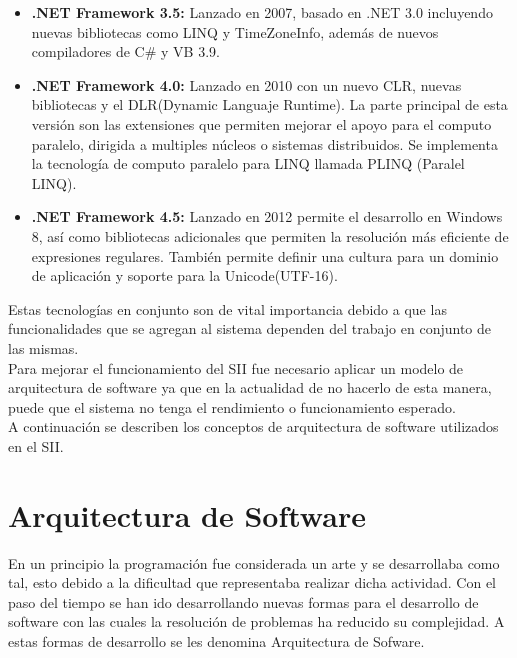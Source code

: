 \begin{itemize}
			\item \textbf{.NET Framework 3.5: } Lanzado en 2007, basado en .NET 3.0 incluyendo nuevas bibliotecas como LINQ y TimeZoneInfo, adem\'as de nuevos compiladores de C\# y VB 3.9.

			\item \textbf{.NET Framework 4.0: } Lanzado en 2010 con un nuevo CLR, nuevas bibliotecas y el DLR(Dynamic Languaje Runtime). La parte principal de esta versi\'on son las extensiones que permiten mejorar el apoyo para el computo paralelo, dirigida a multiples n\'ucleos o sistemas distribuidos. Se implementa la tecnolog\'ia de computo paralelo para LINQ llamada PLINQ (Paralel LINQ).

			\item \textbf{.NET Framework 4.5: } Lanzado en 2012 permite el desarrollo en Windows 8, as\'i como bibliotecas adicionales que permiten la resoluci\'on m\'as eficiente de expresiones regulares. Tambi\'en permite definir una cultura para un dominio de aplicaci\'on y soporte para la Unicode(UTF-16).

		\end{itemize}

Estas tecnolog\'ias en conjunto son de vital importancia debido a que las funcionalidades que se agregan al sistema dependen del trabajo en conjunto de las mismas.\\

Para mejorar el funcionamiento del SII fue necesario aplicar un modelo  de arquitectura de software ya que en la actualidad de no hacerlo de esta manera, puede que el sistema no tenga el rendimiento o funcionamiento esperado.\\

A continuaci\'on se describen los conceptos de arquitectura de software utilizados en el SII.\\


\section{Arquitectura de Software}

En un principio la programaci\'on fue considerada un arte  y se desarrollaba como tal, esto debido a la dificultad que representaba realizar dicha actividad. Con el paso del tiempo se han ido desarrollando nuevas formas para el desarrollo de software con las cuales la resoluci\'on de problemas ha reducido su complejidad. A estas formas de desarrollo se les denomina Arquitectura de Sofware.\\


